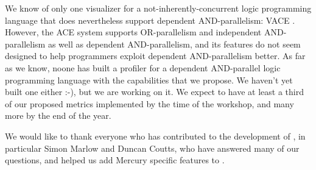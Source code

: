 We know of only one visualizer
for a not-inherently-concurrent logic programming language
that does nevertheless support dependent AND-parallelism: VACE \cite{vace}.
However, the ACE system supports
OR-parallelism and independent AND-parallelism
as well as dependent AND-parallelism,
and its features do not seem designed
to help programmers exploit dependent AND-parallelism better.
As far as we know, noone has built a profiler
for a dependent AND-parallel logic programming language
with the capabilities that we propose.
We haven't yet built one either :-),
but we are working on it.
We expect to have at least a third of our proposed metrics implemented
by the time of the workshop,
and many more by the end of the year.


We would like to thank everyone
who has contributed to the development of \tscope,
in particular Simon Marlow and Duncan Coutts,
who have answered many of our questions,
and helped us add Mercury specific features to \tscope.



